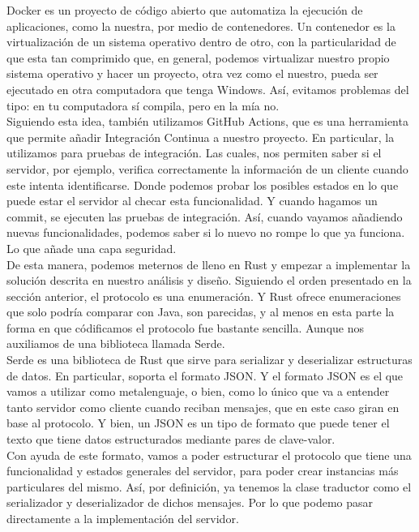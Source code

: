 \documentclass{article}
\begin{document}
Docker es un proyecto de código abierto que automatiza la ejecución de aplicaciones, como la nuestra, por medio de contenedores. Un contenedor es la virtualización de un sistema operativo dentro de otro, con la particularidad de que esta tan comprimido que, en general, podemos virtualizar nuestro propio sistema operativo y hacer un proyecto, otra vez como el nuestro, pueda ser ejecutado en otra computadora que tenga Windows. Así, evitamos problemas del tipo: en tu computadora sí compila, pero en la mía no.\\

Siguiendo esta idea, también utilizamos GitHub Actions, que es una herramienta que permite añadir Integración Continua a nuestro proyecto. En particular, la utilizamos para pruebas de integración. Las cuales, nos permiten saber si el servidor, por ejemplo, verifica correctamente la información de un cliente cuando este intenta identificarse. Donde podemos probar los posibles estados en lo que puede estar el servidor al checar esta funcionalidad. Y cuando hagamos un commit, se ejecuten las pruebas de integración. Así, cuando vayamos añadiendo nuevas funcionalidades, podemos saber si lo nuevo no rompe lo que ya funciona. Lo que añade una capa seguridad.\\

De esta manera, podemos meternos de lleno en Rust y empezar a implementar la solución descrita en nuestro análisis y diseño. Siguiendo el orden presentado en la sección anterior, el protocolo es una enumeración. Y Rust ofrece enumeraciones que solo podría comparar con Java, son parecidas, y al menos en esta parte la forma en que códificamos el protocolo fue bastante sencilla. Aunque nos auxiliamos de una biblioteca llamada Serde.\\

Serde es una biblioteca de Rust que sirve para serializar y deserializar estructuras de datos. En particular, soporta el formato JSON. Y el formato JSON es el que vamos a utilizar como metalenguaje, o bien, como lo único que va a entender tanto servidor como cliente cuando reciban mensajes, que en este caso giran en base al protocolo. Y bien, un JSON es un tipo de formato que puede tener el texto que tiene datos estructurados mediante pares de clave-valor.\\

Con ayuda de este formato, vamos a poder estructurar el protocolo que tiene una funcionalidad y estados generales del servidor, para poder crear instancias más particulares del mismo. Así, por definición, ya tenemos la clase traductor como el serializador y deserializador de dichos mensajes. Por lo que podemo pasar directamente a la implementación del servidor.\\
\end{document}
